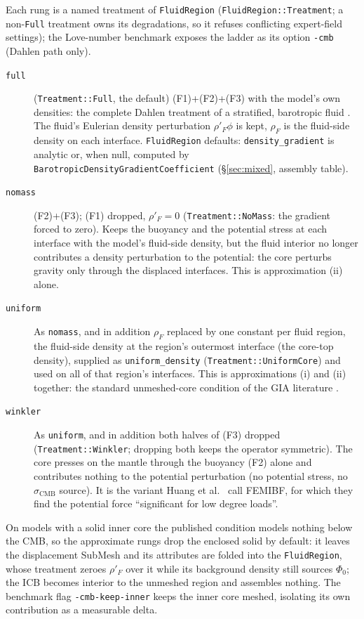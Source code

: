 \documentclass[11pt]{article}
\numberwithin{equation}{section}
\theoremstyle{remark}
\newcommand{\code}[1]{\texttt{#1}}
\begin{document}
Each rung is a named treatment of \code{FluidRegion}
(\code{FluidRegion::Treatment}; a non-\code{Full} treatment owns its
degradations, so it refuses conflicting expert-field settings); the
Love-number benchmark exposes the ladder as its option \code{-cmb}
(Dahlen path only).
\begin{description}
\item[\code{full}] (\code{Treatment::Full}, the default)
  (F1)+(F2)+(F3) with the model's own densities: the
  complete Dahlen treatment of a stratified, barotropic fluid
  \cite{Dahlen1974,AW10}. The fluid's Eulerian density perturbation
  $\rho'_F\phi$ is kept, $\rho_F$ is the fluid-side density on each
  interface. \code{FluidRegion} defaults: \code{density\_gradient} is
  analytic or, when null, computed by
  \code{BarotropicDensityGradientCoefficient} (\S\ref{sec:mixed}, assembly
  table).
\item[\code{nomass}] (F2)+(F3); (F1) dropped, $\rho'_F = 0$
  (\code{Treatment::NoMass}: the gradient forced to zero). Keeps the buoyancy and the
  potential stress at each interface with the model's fluid-side density,
  but the fluid interior no longer contributes a density perturbation to
  the potential: the core perturbs gravity only through the displaced
  interfaces. This is approximation (ii) alone.
\item[\code{uniform}] As \code{nomass}, and in addition $\rho_F$ replaced
  by one constant per fluid region, the fluid-side density at the region's
  outermost interface (the core-top density), supplied as
  \code{uniform\_density} (\code{Treatment::UniformCore}) and used on all
  of that region's interfaces.
  This is approximations (i) and (ii) together: the standard unmeshed-core
  condition of the GIA literature
  \cite{Latychev2005,TrompMitrovica1999,AWahrZhong2013,Huang2023,
  CitcomSVE2025}.
\item[\code{winkler}] As \code{uniform}, and in addition both halves of
  (F3) dropped (\code{Treatment::Winkler}; dropping
  both keeps the operator symmetric). The core presses on the mantle
  through the buoyancy (F2) alone and contributes nothing to the potential
  perturbation (no potential stress, no $\sigma_{\mathrm{CMB}}$ source).
  It is the variant Huang et al.\ \cite{Huang2023} call FEMIBF, for which
  they find the potential force ``significant for low degree loads''.
\end{description}
On models with a solid inner core the published condition models nothing
below the CMB, so the approximate rungs drop the enclosed solid by
default: it leaves the displacement SubMesh and its attributes are folded
into the \code{FluidRegion}, whose treatment zeroes $\rho'_F$ over it
while its background density still sources $\Phi_0$; the ICB becomes
interior to the unmeshed region and assembles nothing. The benchmark flag
\code{-cmb-keep-inner} keeps the inner core meshed, isolating its own
contribution as a measurable delta.
\end{document}
